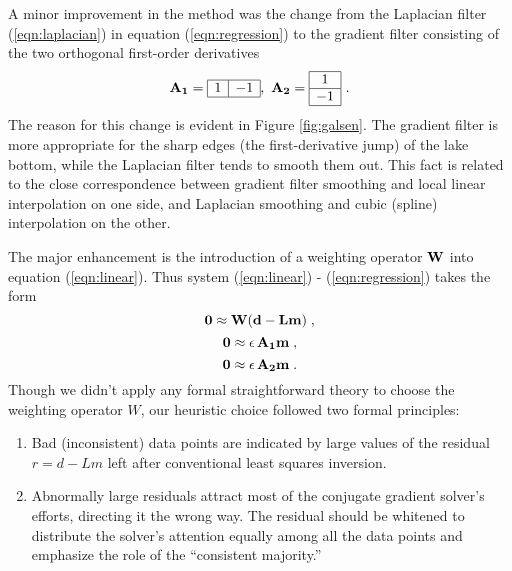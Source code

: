 A minor improvement in the method was the change from the Laplacian filter
(\ref{eqn:laplacian}) in equation (\ref{eqn:regression}) to the gradient filter consisting
of the two
orthogonal first-order derivatives
\begin{equation} 
{\bf A_1}=
\begin{array}{|c|c|}
\hline
1 & -1 \\
\hline
\end{array}
,\,\, {\bf A_2}=
\begin{array}{|c|}
\hline
1 \\
\hline
-1 \\
\hline
\end{array}
\,\,.
\label{eqn:gradient} 
\end{equation}
The reason for this change is evident in Figure \ref{fig:galsen}. The
gradient filter is more appropriate for the
sharp edges (the first-derivative jump) of the lake bottom, while the Laplacian
filter tends to smooth them out. This fact is related to the close
correspondence between gradient filter smoothing and local linear
interpolation on one side, and Laplacian smoothing and cubic (spline)
interpolation on the other. 
\par
The major enhancement is the introduction of a weighting operator
${\bf W}$ into 
equation 
(\ref{eqn:linear}). Thus system (\ref{eqn:linear}) - (\ref{eqn:regression}) takes the
form
\begin{equation} {\bf 0 \approx W (d - Lm)}\;, \label{eqn:irls}
\end{equation}
\begin{equation} 
{\bf 0 \approx \epsilon \, A_1 m}\;, \label{eqn:gradient1} \end{equation}
\begin{equation} 
{\bf 0 \approx \epsilon \, A_2 m}\;. \label{eqn:gradient2} \end{equation}
Though we didn't apply any formal straightforward theory to choose the
weighting operator $W$, our heuristic choice followed two formal principles:
\begin{enumerate} 
\item Bad (inconsistent) data points are indicated by large
values of the residual $r = d - Lm$ left after conventional least squares
inversion. 
\item Abnormally large residuals attract most of the conjugate
gradient solver's efforts, directing it the wrong way. The residual should be
whitened to distribute the solver's attention equally among all the
data points and emphasize the role of the ``consistent majority.'' 
\end{enumerate}
